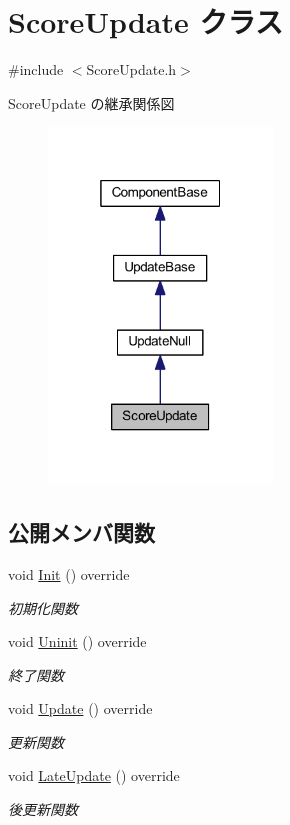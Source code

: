 \hypertarget{class_score_update}{}\section{Score\+Update クラス}
\label{class_score_update}


{\ttfamily \#include $<$Score\+Update.\+h$>$}



Score\+Update の継承関係図\nopagebreak
\begin{figure}[H]
\begin{center}
\leavevmode
\includegraphics[width=169pt]{class_score_update__inherit__graph}
\end{center}
\end{figure}
\subsection*{公開メンバ関数}
\begin{DoxyCompactItemize}
\item 
void \mbox{\hyperlink{class_score_update_afd51e11ad00ebc15d9b3139398437afc}{Init}} () override
\begin{DoxyCompactList}\small\item\em 初期化関数 \end{DoxyCompactList}\item 
void \mbox{\hyperlink{class_score_update_a701d9c84c3ef92b1c54f33b37e23605f}{Uninit}} () override
\begin{DoxyCompactList}\small\item\em 終了関数 \end{DoxyCompactList}\item 
void \mbox{\hyperlink{class_score_update_aae2b398784079a651ed92eb4c634b1c9}{Update}} () override
\begin{DoxyCompactList}\small\item\em 更新関数 \end{DoxyCompactList}\item 
void \mbox{\hyperlink{class_score_update_adc9a48f54828e49c072c298777935893}{Late\+Update}} () override
\begin{DoxyCompactList}\small\item\em 後更新関数 \end{DoxyCompactList}\end{DoxyCompactItemize}
